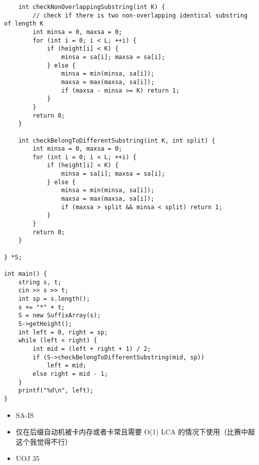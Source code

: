 \documentclass[]{article}
\providecommand{\tightlist}{%
  \setlength{\itemsep}{0pt}\setlength{\parskip}{0pt}}
\begin{document}
\begin{verbatim}
    int checkNonOverlappingSubstring(int K) {
        // check if there is two non-overlapping identical substring of length K
        int minsa = 0, maxsa = 0;
        for (int i = 0; i < L; ++i) {
            if (height[i] < K) {
                minsa = sa[i]; maxsa = sa[i];
            } else {
                minsa = min(minsa, sa[i]);
                maxsa = max(maxsa, sa[i]);
                if (maxsa - minsa >= K) return 1;
            }
        }
        return 0;
    }

    int checkBelongToDifferentSubstring(int K, int split) {
        int minsa = 0, maxsa = 0;
        for (int i = 0; i < L; ++i) {
            if (height[i] < K) {
                minsa = sa[i]; maxsa = sa[i];
            } else {
                minsa = min(minsa, sa[i]);
                maxsa = max(maxsa, sa[i]);
                if (maxsa > split && minsa < split) return 1;
            }
        }
        return 0;
    }

} *S;

int main() {
    string s, t;
    cin >> s >> t;
    int sp = s.length();
    s += "*" + t;
    S = new SuffixArray(s);
    S->getHeight();
    int left = 0, right = sp;
    while (left < right) {
        int mid = (left + right + 1) / 2;
        if (S->checkBelongToDifferentSubstring(mid, sp))
            left = mid;
        else right = mid - 1;
    }
    printf("%d\n", left);
}
\end{verbatim}

\begin{itemize}
\tightlist
\item
  SA-IS
\item
  仅在后缀自动机被卡内存或者卡常且需要 O(1) LCA
  的情况下使用（比赛中敲这个我觉得不行）
\item
  UOJ 35
\end{itemize}
\end{document}
